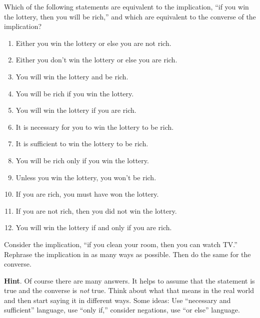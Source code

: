 \documentclass[11pt,]{book}
\theoremstyle{ptxplainnotitle}
\theoremstyle{ptxplaintitle}
\theoremstyle{ptxdefinitionnotitle}
\theoremstyle{ptxdefinitiontitle}
\theoremstyle{ptxdefinitionnotitle}
\theoremstyle{ptxdefinitiontitle}
\theoremstyle{ptxdefinitionnotitle}
\theoremstyle{ptxdefinitiontitle}
\theoremstyle{ptxdefinitiontitlenonumber}
\theoremstyle{ptxdefinitiontitlenonumber}
\numberwithin{equation}{chapter}
\begin{document}
\begin{divisionexercise}{15}\hypertarget{exercise-163}{}
\hypertarget{p-2300}{}%
Which of the following statements are equivalent to the implication, ``if you win the lottery, then you will be rich,'' and which are equivalent to the converse of the implication? \leavevmode%
\begin{enumerate}[label=(\alph*)]
\item\hypertarget{li-1183}{}\hypertarget{p-2301}{}%
Either you win the lottery or else you are not rich.%
\item\hypertarget{li-1184}{}\hypertarget{p-2302}{}%
Either you don't win the lottery or else you are rich.%
\item\hypertarget{li-1185}{}\hypertarget{p-2303}{}%
You will win the lottery and be rich.%
\item\hypertarget{li-1186}{}\hypertarget{p-2304}{}%
You will be rich if you win the lottery.%
\item\hypertarget{li-1187}{}\hypertarget{p-2305}{}%
You will win the lottery if you are rich.%
\item\hypertarget{li-1188}{}\hypertarget{p-2306}{}%
It is necessary for you to win the lottery to be rich.%
\item\hypertarget{li-1189}{}\hypertarget{p-2307}{}%
It is sufficient to win the lottery to be rich.%
\item\hypertarget{li-1190}{}\hypertarget{p-2308}{}%
You will be rich only if you win the lottery.%
\item\hypertarget{li-1191}{}\hypertarget{p-2309}{}%
Unless you win the lottery, you won't be rich.%
\item\hypertarget{li-1192}{}\hypertarget{p-2310}{}%
If you are rich, you must have won the lottery.%
\item\hypertarget{li-1193}{}\hypertarget{p-2311}{}%
If you are not rich, then you did not win the lottery.%
\item\hypertarget{li-1194}{}\hypertarget{p-2312}{}%
You will win the lottery if and only if you are rich.%
\end{enumerate}
%
\end{divisionexercise}%
\begin{divisionexercise}{16}\hypertarget{exercise-164}{}
\hypertarget{p-2326}{}%
Consider the implication, ``if you clean your room, then you can watch TV.'' Rephrase the implication in as many ways as possible. Then do the same for the converse.%
\par\smallskip%
\noindent\textbf{Hint}.\hypertarget{hint-13}{}\quad%
\hypertarget{p-2327}{}%
Of course there are many answers. It helps to assume that the statement is true and the converse is \emph{not} true. Think about what that means in the real world and then start saying it in different ways. Some ideas: Use ``necessary and sufficient'' language, use ``only if,'' consider negations, use ``or else'' language.%
\end{divisionexercise}%
\end{document}

